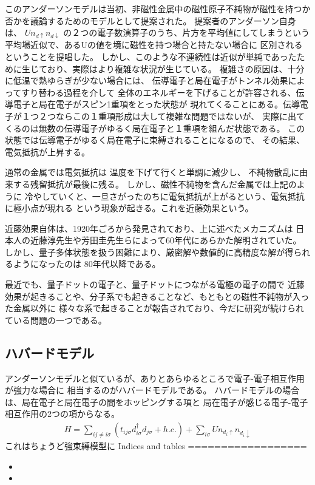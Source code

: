 \documentclass[letterpaper,10pt,dvipdfmx]{sphinxmanual}
\begin{document}
このアンダーソンモデルは当初、非磁性金属中の磁性原子不純物が磁性を持つか否かを議論するためのモデルとして提案された。
提案者のアンダーソン自身は、
\(Un_{d\uparrow}n_{d\downarrow}\)
の２つの電子数演算子のうち、片方を平均値にしてしまうという平均場近似で、あるUの値を境に磁性を持つ場合と持たない場合に
区別されるということを提唱した。
しかし、このような不連続性は近似が単純であったために生じており、実際はより複雑な状況が生じている。
複雑さの原因は、十分に低温で熱ゆらぎが少ない場合には、
伝導電子と局在電子がトンネル効果によってすり替わる過程を介して
全体のエネルギーを下げることが許容される、伝導電子と局在電子がスピン1重項をとった状態が
現れてくることにある。伝導電子が１つ２つならこの１重項形成は大して複雑な問題ではないが、
実際に出てくるのは無数の伝導電子がゆるく局在電子と１重項を組んだ状態である。
この状態では伝導電子がゆるく局在電子に束縛されることになるので、
その結果、電気抵抗が上昇する。

通常の金属では電気抵抗は
温度を下げて行くと単調に減少し、
不純物散乱に由来する残留抵抗が最後に残る。
しかし、磁性不純物を含んだ金属では上記のように
冷やしていくと、一旦さがったのちに電気抵抗が上がるという、電気抵抗に極小点が現れる
という現象が起きる。これを近藤効果という。

近藤効果自体は、1920年ごろから発見されており、上に述べたメカニズムは
日本人の近藤淳先生や芳田圭先生らによって60年代にあらかた解明されていた。
しかし、量子多体状態を扱う困難により、厳密解や数値的に高精度な解が得られるようになったのは
80年代以降である。

最近でも、量子ドットの電子と、量子ドットにつながる電極の電子の間で
近藤効果が起きることや、分子系でも起きることなど、もともとの磁性不純物が入った金属以外に
様々な系で起きることが報告されており、今だに研究が続けられている問題の一つである。


\subsection{ハバードモデル}
\label{\detokenize{index:id5}}
アンダーソンモデルと似ているが、ありとあらゆるところで電子-電子相互作用が強力な場合に
相当するのがハバードモデルである。
ハバードモデルの場合は、局在電子と局在電子の間をホッピングする項と
局在電子が感じる電子-電子相互作用の2つの項からなる。
\begin{equation*}
\begin{split}H=\sum_{i j\neq i\sigma}( t_{ij\sigma} d_{i\sigma}^\dagger d_{j\sigma}+h.c.) +\sum_{i\sigma}Un_{d_i\uparrow}n_{d_i\downarrow}\end{split}
\end{equation*}
これはちょうど強束縛模型に
Indices and tables
==================
\begin{itemize}
\item {} 

\item {} 

\end{itemize}



\renewcommand{\indexname}{索引}
\printindex
\end{document}
